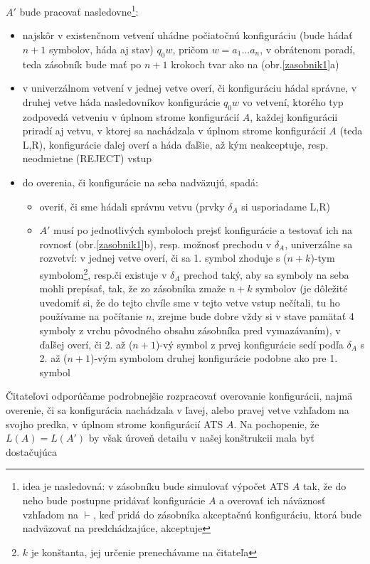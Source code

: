 \begin{dokaz}
  \smallskip
  $A'$ bude pracovať nasledovne\footnote{idea je nasledovná: v
  zásobníku bude simulovať výpočet ATS $A$ tak, že do neho bude
  postupne pridávať konfigurácie $A$ a overovať ich náväznosť
  vzhľadom na $\vdash$, keď pridá do zásobníka akceptačnú
  konfiguráciu, ktorá bude nadväzovať na predchádzajúce, akceptuje}:
  \begin{itemize}
    \item najskôr v existenčnom vetvení uhádne počiatočnú
    konfiguráciu (bude hádať $n+1$ symbolov, háda aj stav) $q_0w$,
    pričom $w=a_1\dots a_n$, v obrátenom poradí, teda zásobník bude
    mať po $n+1$ krokoch tvar ako na (obr.\ref{zasobnik1}a)
    \item v univerzálnom vetvení v jednej vetve overí, či konfiguráciu
    hádal správne, v druhej vetve háda nasledovníkov konfigurácie
    $q_0w$ vo vetvení, ktorého typ zodpovedá vetveniu v úplnom strome
    konfigurácií $A$, každej konfigurácii priradí aj vetvu, v ktorej
    sa nachádzala v úplnom strome konfigurácií $A$ (teda L,R),
    konfigurácie ďalej overí a háda ďaľšie, až kým neakceptuje, resp.
    neodmietne (REJECT) vstup
    \item do overenia, či konfigurácie na seba nadväzujú, spadá:
      \begin{itemize}
        \item overiť, či sme hádali správnu vetvu (prvky $\delta_A$
        si usporiadame L,R)
        \item $A'$ musí po jednotlivých symboloch prejsť konfigurácie a
        testovať ich na rovnosť (obr.\ref{zasobnik1}b), resp. možnosť
        prechodu v $\delta_A$, univerzálne sa rozvetví: v jednej vetve
        overí, či sa 1. symbol zhoduje s ($n+k$)-tym symbolom\footnote{$k$
        je konštanta, jej určenie prenechávame na čitateľa}, resp.či
        existuje v $\delta_A$ prechod taký, aby sa symboly na seba mohli
        prepísať, tak, že zo zásobníka zmaže $n+k$ symbolov (je dôležité
        uvedomiť si, že do tejto chvíle sme v tejto vetve vstup nečítali,
        tu ho používame na počítanie $n$, zrejme bude dobre vždy si v
        stave pamätať 4 symboly z vrchu pôvodného obsahu zásobníka pred
        vymazávaním), v ďaľšej overí, či 2. až ($n+1$)-vý symbol z prvej
        konfigurácie sedí podľa $\delta_A$ s 2. až ($n+1$)-vým symbolom
        druhej konfigurácie podobne ako pre 1. symbol
      \end{itemize}
  \end{itemize}
  Čitateľovi odporúčame podrobnejšie rozpracovať overovanie
  konfigurácii, najmä overenie, či sa konfigurácia nachádzala v
  ľavej, alebo pravej vetve vzhľadom na svojho predka, v úplnom
  strome konfigurácií ATS $A$. Na pochopenie, že $L(A)=L(A')$ by
  však úroveň detailu v našej konštrukcii mala byť dostačujúca
\end{dokaz}

